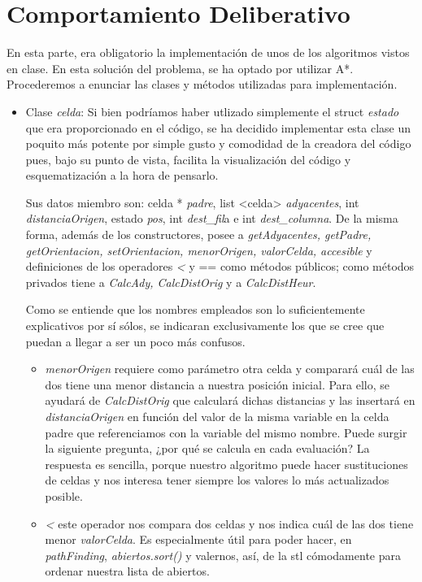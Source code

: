 \documentclass[12pt]{article}
\begin{document}
\section{Comportamiento Deliberativo}
En esta parte, era obligatorio la implementación de unos de los algoritmos vistos en clase. En esta solución del problema, se ha optado por utilizar A*. Procederemos a enunciar las clases y métodos utilizadas para implementación.
\begin{itemize}
\item Clase \emph{celda}: Si bien podríamos haber utlizado simplemente el struct \emph{estado} que era proporcionado en el código, se ha decidido implementar esta clase un poquito más potente por simple gusto y comodidad de la creadora del código pues, bajo su punto de vista, facilita la visualización del código y esquematización a la hora de pensarlo.

Sus datos miembro son:  celda *\emph{ padre}, list <celda> \emph{adyacentes}, int \emph{distanciaOrigen}, estado \emph{pos}, int \emph{dest\_fil}a e int \emph{dest\_columna}. De la misma forma, además de los constructores, posee a \emph{getAdyacentes, getPadre, getOrientacion, setOrientacion, menorOrigen, valorCelda, accesible} y definiciones de los operadores \emph{<} y == como métodos públicos; como métodos privados tiene a \emph{CalcAdy, CalcDistOrig} y a \emph{CalcDistHeur}.

Como se entiende que los nombres empleados son lo suficientemente explicativos por sí sólos, se indicaran exclusivamente los que se cree que puedan a llegar a ser un poco más confusos.
\begin{itemize}
\item \emph{menorOrigen} requiere como parámetro otra celda y comparará cuál de las dos tiene una menor distancia a nuestra posición inicial. Para ello, se ayudará de \emph{CalcDistOrig} que calculará dichas distancias y las insertará en \emph{distanciaOrigen} en función del valor de la misma variable en la celda padre que referenciamos con la variable del mismo nombre. Puede surgir la siguiente pregunta, ¿por qué se calcula en cada evaluación? La respuesta es sencilla, porque nuestro algoritmo puede hacer sustituciones de celdas y nos interesa tener siempre los valores lo más actualizados posible.

\item \emph{<} este operador nos compara dos celdas y nos indica cuál de las dos tiene menor \emph{valorCelda}. Es especialmente útil para poder hacer, en \emph{pathFinding}, \emph{abiertos.sort()} y valernos, así, de la stl cómodamente para ordenar nuestra lista de abiertos.


\end{itemize}
\end{itemize}
\end{document}
